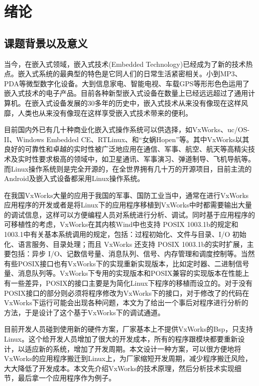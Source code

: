 \chapter{绪论}
\section{课题背景以及意义}
	当今，在嵌入式领域，嵌入式技术(Embedded Technology)已经成为了新的技术热点。嵌入式系统的最典型的特色是它同人们的日常生活紧密相关。小到MP3、PDA等微型数字化设备。大到信息家电、智能电视、车载GPS等形形色色运用了嵌入式技术的电子产品。目前各种新型嵌入式设备在数量上已经远远超过了通用计算机。在嵌入式设备发展的30多年的历史中，嵌入式技术从来没有像现在这样风靡，人类也从来没有像现在这样享受嵌入式技术带来的便利。

	目前国内外已有几十种商业化嵌入式操作系统可以供选择，如VxWorks、uc/OS-II、Windows Embedded CE、RTLinux、和“女蜗Hopen”等。其中VxWorks以其良好的可靠性和卓越的实时性被广泛地应用在通信、军事、航空、航天等高精尖技术及实时性要求极高的领域中，如卫星通讯、军事演习、弹道制导、飞机导航等。而Linux操作系统则是完全开源的，在全世界拥有几十万的开源项目，目前主流的Android及嵌入式设备都采用Linux操作系统。
	
	在我国VxWorks大量的应用于我国的军事、国防工业当中，通常在进行VxWorks应用程序的开发或者是将Linux下的应用程序移植到VxWorks中时都需要输出大量的调试信息，这样可以方便编程人员对系统进行分析、调试。同时基于应用程序的可移植性的考虑，VxWorks在其内核Wind中也支持 POSIX 1003.1b的规定和1003.1中有关基本系统调用的规定，包括：过程初始化、文件与目录、I/O 初始化、语言服务、目录处理；而且 VxWorks 还支持 POSIX 1003.1b的实时扩展，主要包括：异步 I/O、记数信号量、消息队列、信号、内存管理和调度控制等\cite{Wind2003VxWorks}。当然有些POSIX接口也有VxWorks下的实现重新实现版本，比如定时器、二进制信号量、消息队列等。VxWorks下专用的实现版本和POSIX兼容的实现版本在性能上有一些差异，POSIX的接口主要是为简化Linux下程序的移植而设立的。对于没有POSIX接口的部分则必须将程序修改为VxWorks下的接口，对于修改了的代码在VxWorks下运行可能会出现各种问题，本文为了给出一个事后对程序进行分析的方法，于是设计了这个基于VxWorks下的调试通道。
	
	目前开发人员碰到使用新的硬件方案，厂家基本上不提供VxWorks的Bsp，只支持Linux。这个给开发人员增加了很大的开发成本，所有的程序跟模块都要重新设计，以适应新的系统，增加了开发周期。本文设计一种方案，可以很方便地将VxWorks的应用程序搬迁到Linux上，为厂家缩短开发周期，减少程序搬迁风险，大大降低了开发成本。本文先介绍VxWorks的技术原理，然后分析技术实现细节，最后拿一个应用程序作为例子。 
		
